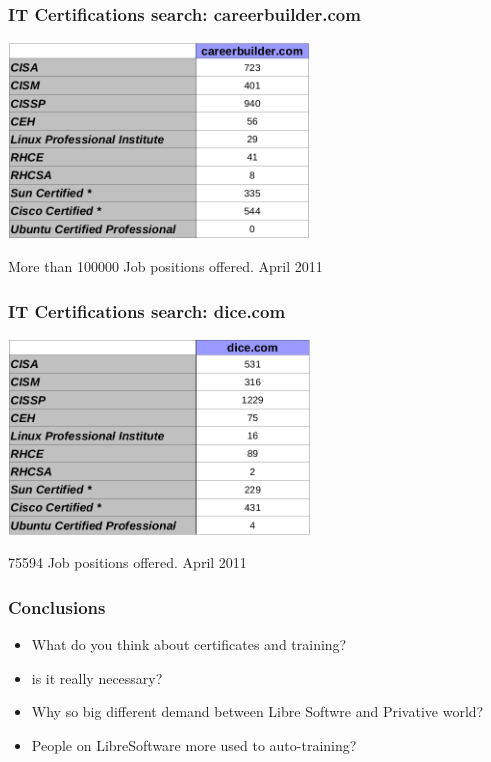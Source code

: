 \documentclass{beamer}
\begin{document}

\begin{frame}
\frametitle{IT Certifications search: careerbuilder.com}
\begin{center}
  \includegraphics[width=8cm]{figs/careerbuilder.png}
\end{center}
\begin{center}
\normalsize{More than 100000 Job positions offered. April 2011}
\end{center}
\end{frame}



\begin{frame}
\frametitle{IT Certifications search: dice.com}
\begin{center}
  \includegraphics[width=8cm]{figs/dice.png}
\end{center}
\begin{center}
\normalsize{75594 Job positions offered. April 2011}
\end{center}
\end{frame}


\begin{frame}
\frametitle{Conclusions}
\begin{itemize}
\item What do you think about certificates and training?
\item is it really necessary?
\item Why so big different demand between Libre Softwre and Privative world?
\item People on LibreSoftware more used to auto-training?
\end{itemize}
\end{frame}
\end{document}
